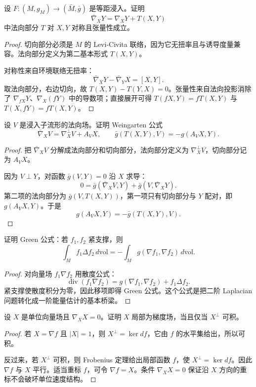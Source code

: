\documentclass[11pt,a4paper,openany]{ctexbook}
\numberwithin{equation}{chapter}
\begin{document}
\begin{problem}
设 \(F\colon (M,g_M)\to(\bar M,\bar g)\) 是等距浸入。证明
\[
\bar\nabla_XY=\nabla_XY+T(X,Y)
\]
中法向部分 \(T\) 对 \(X,Y\) 对称且张量性成立。
\end{problem}
\begin{proof}
切向部分必须是 \(M\) 的 Levi-Civita 联络，因为它无扭率且与诱导度量兼容。法向部分定义为第二基本形式 \(T(X,Y)\)。

对称性来自环境联络无扭率：
\[
\bar\nabla_XY-\bar\nabla_YX=[X,Y].
\]
取法向部分，右边切向，故 \(T(X,Y)-T(Y,X)=0\)。张量性来自法向投影消除了 \(\nabla_{fX}Y\)、\(\nabla_X(fY)\) 中的导数项；直接展开可得 \(T(fX,Y)=fT(X,Y)\) 与 \(T(X,fY)=fT(X,Y)\)。
\end{proof}

\begin{problem}
设 \(V\) 是浸入子流形的法向场。证明 Weingarten 公式
\[
\bar\nabla_XV=\nabla_X^\perp V+A_VX,\qquad
\bar g(T(X,Y),V)=-g(A_VX,Y).
\]
\end{problem}
\begin{proof}
把 \(\bar\nabla_XV\) 分解成法向部分和切向部分，法向部分定义为 \(\nabla_X^\perp V\)，切向部分记为 \(A_VX\)。

因为 \(V\perp Y\)，对函数 \(\bar g(V,Y)=0\) 沿 \(X\) 求导：
\[
0=\bar g(\bar\nabla_XV,Y)+\bar g(V,\bar\nabla_XY).
\]
第二项的法向部分为 \(\bar g(V,T(X,Y))\)，第一项只有切向部分与 \(Y\) 配对，即 \(g(A_VX,Y)\)。于是
\[
g(A_VX,Y)=-\bar g(T(X,Y),V).
\]
\end{proof}

\begin{problem}
证明 Green 公式：若 \(f_1,f_2\) 紧支撑，则
\[
\int_M f_1\Delta f_2\,d\mathrm{vol}
=-\int_M g(\nabla f_1,\nabla f_2)\,d\mathrm{vol}.
\]
\end{problem}
\begin{proof}
对向量场 \(f_1\nabla f_2\) 用散度公式：
\[
\operatorname{div}(f_1\nabla f_2)
=g(\nabla f_1,\nabla f_2)+f_1\Delta f_2.
\]
紧支撑使散度积分为零，因此移项即得 Green 公式。这个公式是把二阶 Laplacian 问题转化成一阶能量估计的基本桥梁。
\end{proof}

\begin{problem}
设 \(X\) 是单位向量场且 \(\nabla_XX=0\)。证明 \(X\) 局部为梯度场，当且仅当 \(X^\perp\) 可积。
\end{problem}
\begin{proof}
若 \(X=\nabla f\) 且 \(|X|=1\)，则 \(X^\perp=\ker df\)，它由 \(f\) 的水平集给出，所以可积。

反过来，若 \(X^\perp\) 可积，则 Frobenius 定理给出局部函数 \(f\)，使 \(X^\perp=\ker df\)。因此 \(\nabla f\) 与 \(X\) 平行。适当重标 \(f\)，可令 \(\nabla f=X\)。条件 \(\nabla_XX=0\) 保证沿 \(X\) 方向的重标不会破坏单位速度结构。
\end{proof}
\end{document}
